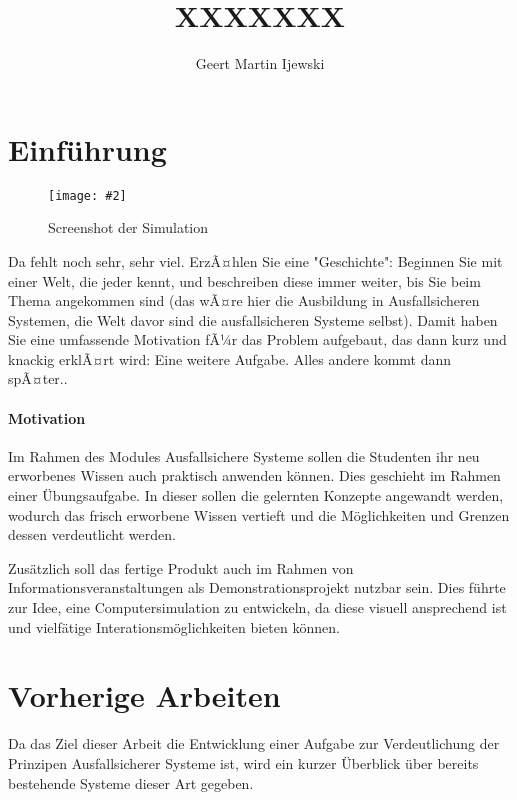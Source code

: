 \documentclass[
    12pt,
    bibliography=totoc,
    ngerman,
    enabledeprecatedfontcommands
]{scrartcl}
\title{XXXXXXX}
\author{Geert Martin Ijewski}
\newcommand{\includevisio}[2][]{\texttt{[image: \#2]}}
\begin{document}
\maketitle
{}
\thispagestyle{empty}

\clearpage
\tableofcontents
\listoffigures
\listoftables
\clearpage
\printglossaries

\clearpage
\section{Einf{\"{u}}hrung}
\begin{figure}
	\centering
	\includevisio[width=\textwidth]{simulation}
	\caption{Screenshot der Simulation}
	\label{fig:simulation}
\end{figure}

Da fehlt noch sehr, sehr viel. ErzÃ¤hlen Sie eine "Geschichte": Beginnen
Sie mit einer Welt, die jeder kennt, und beschreiben diese immer weiter,
bis Sie beim Thema angekommen sind (das wÃ¤re hier die Ausbildung in
Ausfallsicheren Systemen, die Welt davor sind die ausfallsicheren
Systeme selbst). Damit haben Sie eine umfassende Motivation fÃ¼r das
Problem aufgebaut, das dann kurz und knackig erklÃ¤rt wird: Eine weitere
Aufgabe. Alles andere kommt dann spÃ¤ter..

\paragraph{Motivation} Im Rahmen des Modules Ausfallsichere Systeme sollen die Studenten ihr neu erworbenes Wissen auch praktisch anwenden k{\"{o}}nnen. Dies geschieht im Rahmen einer {\"{U}}bungsaufgabe. In dieser sollen die gelernten Konzepte angewandt werden, wodurch das frisch erworbene Wissen vertieft und die M{\"{o}}glichkeiten und Grenzen dessen verdeutlicht werden.

Zus{\"{a}}tzlich soll das fertige Produkt auch im Rahmen von Informationsveranstaltungen als Demonstrationsprojekt nutzbar sein.
Dies f{\"{u}}hrte zur Idee, eine Computersimulation zu entwickeln, da diese visuell ansprechend ist und vielf{\"{a}}tige
Interationsm{\"{o}}glichkeiten bieten k{\"{o}}nnen.

\clearpage
\section{Vorherige Arbeiten}
Da das Ziel dieser Arbeit die Entwicklung einer Aufgabe zur Verdeutlichung der Prinzipen Ausfallsicherer Systeme ist, wird ein kurzer {\"{U}}berblick {\"{u}}ber bereits bestehende Systeme dieser Art gegeben.
\end{document}

